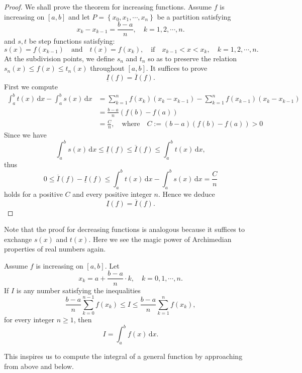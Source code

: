 \documentclass[a4paper]{ctexart}
\begin{document}
	\begin{proof}
		We shall prove the theorem for increasing functions. Assume $f$ is increasing on $[a,b]$ and let $P=\left\{x_0,x_1,\cdots,x_n\right\}$ be a partition satisfying
		\[
		x_k - x_{k-1} = \frac{b-a}{n}, \quad k=1,2,\cdots,n.
		\]
		and $s,t$ be step functions satisfying:
		\[
		s(x)=f(x_{k-1})\quad \text{and}\quad t(x)=f(x_k),\quad \text{if}\quad x_{k-1}<x<x_k,\quad k=1,2,\cdots,n.
		\]
		At the subdivision points, we define $s_n$ and $t_n$ so as to preserve the relation $s_n(x)\le f(x)\le t_n(x)$ throughout $[a,b]$. 
		It suffices to prove
		\[
		\underline{I}(f) = \overline{I}(f).
		\]
		First we compute
		\begin{align*}
			\int_a^b t(x)\, \mathrm{d}x - \int_a^b s(x)\,\mathrm{d}x
			&= \sum_{k=1}^n f(x_k)(x_k-x_{k-1}) - \sum_{k=1}^n f(x_{k-1})(x_k-x_{k-1})\\[4pt]
			&= \frac{b-a}{n}\left(f(b)-f(a)\right) \\[4pt]
			&= \frac{C}{n}, \quad \text{where} \quad C:=(b-a)(f(b)-f(a))>0
		\end{align*}
		Since we have
		\[
		\int_a^b s(x)\,\mathrm{d}x \le \underline{I}(f)\le 
		\overline{I}(f) \le \int_a^b t(x)\, \mathrm{d}x,
		\]
		thus
		\[
		0 \le \overline{I}(f) - \underline{I}(f) 
		\le \int_a^b t(x)\, \mathrm{d}x - \int_a^b s(x)\,\mathrm{d}x
		= \frac{C}{n}
		\]
		holds for a positive $C$ and every positive integer $n$. Hence we deduce
		\[
		\underline{I}(f) = \overline{I}(f).
		\]
	\end{proof}
	\begin{myrmk}
		Note that the proof for decreasing functions is analogous because it suffices to exchange $s(x)$ and $t(x)$. Here we see the magic power of Archimedian properties of real numbers again.
	\end{myrmk}
	\begin{mythm}
		Assume $f$ is increasing on $[a,b]$. Let
		\[
		x_k = a + \frac{b-a}{n}\cdot k,\quad k=0,1,\cdots,n.
		\]
		If $I$ is any number satisfying the inequalities
		\[
		\frac{b-a}{n}\sum_{k=0}^{n-1}f(x_k) \le I \le
		\frac{b-a}{n}\sum_{k=1}^{n}f(x_k),
		\]
		for every integer $n\ge 1$,	then
		\[
		I = \int_a^b f(x)\,\mathrm{d}x.
		\]
	\end{mythm}
	\begin{myrmk}
		This inspires us to compute the integral of a general function by approaching from above and below.
	\end{myrmk}
\end{document}
